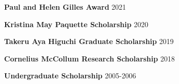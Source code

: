 {\bf Paul and Helen Gilles Award} \hfill 2021

\vspace{\y}
{\bf Kristina May Paquette Scholarship} \hfill 2020

\vspace{\y}
{\bf Takeru Aya Higuchi Graduate Scholarship} \hfill 2019


\vspace{\y}
{\bf Cornelius McCollum Research Scholarship} \hfill 2018

\vspace{\y}
{\bf Undergraduate Scholarship} \hfill 2005-2006


